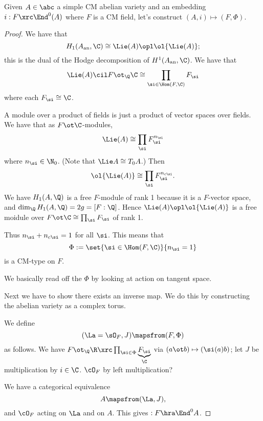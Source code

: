 Given $A\in \abc$ a simple CM abelian variety and an embedding $i:F\xrc \End^0(A)$ where $F$ is a CM field, let's construct $(A,i)\mapsto (F,\Phi)$.


\begin{proof}
We have that
\[
H_1(A_{\text{an}},\C)\cong \Lie(A)\opl \ol{\Lie(A)};
\]
this is the dual of the Hodge decomposition of $H^1(A_{\text{an}},\C)$. %
We have that 
\[
\Lie(A)\cil F\ot_{\Q}\C\cong \prod_{\si\in \Hom(F,\C)} F_{\si}
\]
where each $F_{\si}\cong \C$.

A module over a product of fields is just a product of vector spaces over fields. We have that as $F\ot \C$-modules,
\[
\Lie(A)\cong \prod_{\si} F_{\si}^{n_{\si}}
\]
where $n_{\si}\in \N_0$. (Note that $\Lie A\cong T_0A$.) Then
\[
\ol{\Lie(A)}\cong \prod_{\si} F_{\si}^{n_{c\si}}.
\]
We have $H_1(A,\Q)$ is a free $F$-module of rank 1 because it is a $F$-vector space, and $\dim_{\Q}H_1(A,\Q)=2g=[F:\Q]$. Hence $\Lie(A)\opl \ol{\Lie(A)}$ is a free moidule over $F\ot \C\cong \prod_{\si}F_{\si}$ of rank 1. %

Thus $n_{\si}+n_{c\si}=1$ for all $\si$. This means that 
\[
\Phi:=\set{\si\in \Hom(F,\C)}{n_{\si}=1}
\]
is a CM-type on $F$. 

We basically read off the $\Phi$ by looking at action on tangent space.

Next we have to show there exists an inverse map. We do this by constructing the abelian variety as a complex torus.

We define
\[
(\La=\sO_F, J)\mapsfrom (F,\Phi)
\]
as follows. We have $F\ot_{\Q}\R\xrc \prod_{\si\in \Phi} \underbrace{F_{\si}}_{\C}$ via $(a\ot b)\mapsto (\si(a)b)$; let $J$ be multiplication by $i\in \C$. 
$\cO_F$ by left multiplication?

We have a categorical equivalence
\[
A\mapsfrom (\La,J),
\] 
and $\cO_F$ acting on $\La$ and on $A$. This gives $:F\hra \End^0A$. 
\end{proof}

